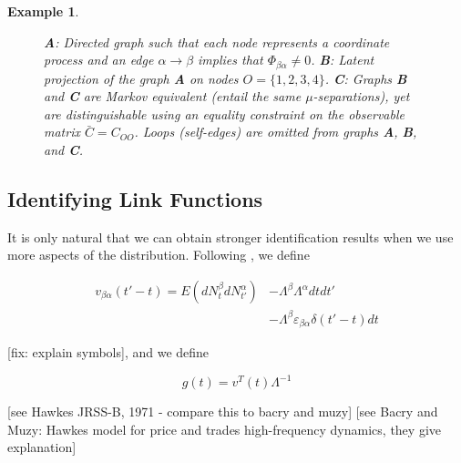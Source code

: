\documentclass[accepted]{uai2021} %
\newtheorem{exmp}[thm]{Example}
\begin{document}
\begin{exmp}
\begin{figure*}
\begin{subfigure}{0.3\linewidth}
			\end{subfigure}
			\caption{\label{fig:smallCycle} \textbf{A}: Directed graph such 
			that 
			each node represents a coordinate process and an edge $\alpha 
			\rightarrow \beta$ implies that $\Phi_{\beta\alpha}\neq 0$. 
			\textbf{B}: Latent projection of the graph \textbf{A} on nodes $O = 
			\{1,2,3,4\}$. \textbf{C}: Graphs \textbf{B} and \textbf{C} are 
			Markov 
			equivalent (entail the same $\mu$-separations), yet are 
			distinguishable using an equality constraint on the observable 
			matrix $\bar{C} = C_{OO}$. Loops 
			(self-edges) are omitted from 
			graphs \textbf{A}, \textbf{B}, and \textbf{C}.}
		\end{figure*}
\end{exmp}



\subsection{Identifying Link Functions}
\label{ssec:idCauFunc}

It is only natural that we can obtain stronger identification results when we 
use more aspects of the distribution. Following 
\cite{bacry2016}, we define

\begin{align}
	v_{\beta\alpha}(t' - t) = E(dN_t^\beta dN_{t'}^\alpha) & - 
	\Lambda^\beta\Lambda^\alpha dt dt' \nonumber \\ & - \Lambda^\beta 
	\varepsilon_{\beta\alpha} 
	\delta(t'-t) dt
	\label{eq:infv}
\end{align}



[fix: explain symbols], and we define

$$
g(t) = v^T(t)\Lambda^{-1}
$$

[see Hawkes JRSS-B, 1971 - compare this to bacry and muzy]
[see  Bacry and Muzy: Hawkes model for price and trades high-frequency 
dynamics, they give explanation]
\end{document}
